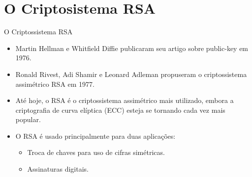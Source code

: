 \documentclass{beamer}
\begin{document}
\section{O Criptosistema RSA}
\begin{frame}{O Criptossistema RSA}
    \begin{itemize}
        \item Martin Hellman e Whitfield Diffie publicaram seu artigo sobre public-key em 1976.
        \vspace{0.5em}
        \item Ronald Rivest, Adi Shamir e Leonard Adleman propuseram o criptossistema assimétrico RSA em 1977.
        \vspace{0.5em}
        \item Até hoje, o RSA é o criptossistema assimétrico mais utilizado, embora a criptografia de curva elíptica (ECC) esteja se tornando cada vez mais popular.
        \vspace{0.5em}
        \item O RSA é usado principalmente para duas aplicações:
        \begin{itemize}
            \item Troca de chaves para uso de cifras simétricas.
            \item Assinaturas digitais.
        \end{itemize}
    \end{itemize}
\end{frame}
\end{document}
